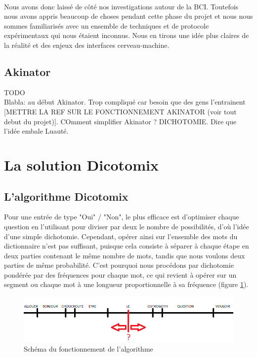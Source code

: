 \documentclass[11pt,a4paper]{article}
\theoremstyle{plain}
\theoremstyle{definition}
\begin{document}
\paragraph{} Nous avons donc laissé de côté nos investigations autour de la BCI. Toutefois nous avons appris beaucoup de choses pendant cette phase du projet et nous nous sommes 
familiarisés avec un ensemble de techniques et de protocole expérimentaux qui nous étaient inconnus. Nous en tirons une idée plus claires de la réalité et des enjeux des interfaces cerveau-machine.

\subsection{Akinator}

TODO\\

Blabla: au début Akinator. Trop compliqué car besoin que des gens l'entrainent [METTRE LA REF SUR LE FONCTIONNEMENT AKINATOR (voir tout debut du projet)]. 
COmment simplifier Akinator ? DICHOTOMIE. Dire que l'idée embale Luauté.


\section{La solution Dicotomix}
 
\subsection{L'algorithme Dicotomix}
Pour une entrée de type "Oui" / "Non", le plus efficace est d'optimiser chaque question en l'utilisant pour diviser par deux le nombre de possibilités, d'où l'idée d'une simple dichotomie.
Cependant, opérer ainsi sur l'ensemble des mots du dictionnaire n'est pas suffisant, puisque cela consiste à séparer à chaque étape en deux parties contenant le même nombre de mots, tandis que nous voulons deux parties de même probabilité. 
C'est pourquoi nous procédons par dichotomie pondérée par des fréquences pour chaque mot, ce qui revient à opérer sur un segment ou chaque mot à une longueur proportionnelle à sa fréquence (figure \ref{algo}).

\begin{figure}[h!]
\centering
\includegraphics[scale=0.6]{schema_algo.png}
\caption{Schéma du fonctionnement de l'algorithme}
\label{algo}
\end{figure}
\end{document}
